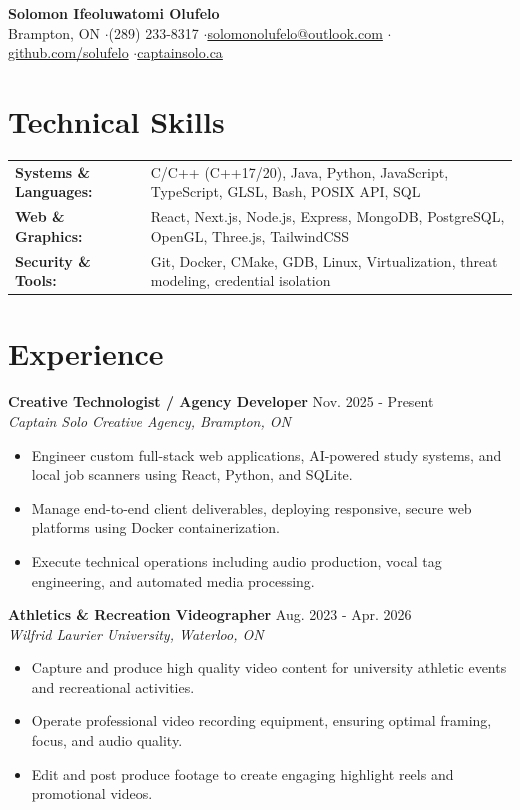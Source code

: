 \documentclass[a4paper,10pt]{article}
\begin{document}
\begin{center}
    {\LARGE \textbf{Solomon Ifeoluwatomi Olufelo}} \\[2pt]
    Brampton, ON \enspace$\cdot$\enspace (289) 233-8317 \enspace$\cdot$\enspace \href{mailto:solomonolufelo@outlook.com}{solomonolufelo@outlook.com} \enspace$\cdot$\enspace \href{https://github.com/solufelo}{github.com/solufelo} \enspace$\cdot$\enspace \href{https://captainsolo.ca}{captainsolo.ca}
\end{center}

\section*{Technical Skills}
\begin{tabularx}{\textwidth}{@{}lX@{}}
\textbf{Systems \& Languages:} & C/C++ (C++17/20), Java, Python, JavaScript, TypeScript, GLSL, Bash, POSIX API, SQL \\
\textbf{Web \& Graphics:} & React, Next.js, Node.js, Express, MongoDB, PostgreSQL, OpenGL, Three.js, TailwindCSS \\
\textbf{Security \& Tools:} & Git, Docker, CMake, GDB, Linux, Virtualization, threat modeling, credential isolation \\
\end{tabularx}

\section*{Experience}
\textbf{Creative Technologist / Agency Developer} \hfill Nov. 2025 - Present \\
\textit{Captain Solo Creative Agency, Brampton, ON}
\begin{itemize}
    \item Engineer custom full-stack web applications, AI-powered study systems, and local job scanners using React, Python, and SQLite.
    \item Manage end-to-end client deliverables, deploying responsive, secure web platforms using Docker containerization.
    \item Execute technical operations including audio production, vocal tag engineering, and automated media processing.
\end{itemize}

\vspace{3pt}
\textbf{Athletics \& Recreation Videographer} \hfill Aug. 2023 - Apr. 2026 \\
\textit{Wilfrid Laurier University, Waterloo, ON}
\begin{itemize}
    \item Capture and produce high quality video content for university athletic events and recreational activities.
    \item Operate professional video recording equipment, ensuring optimal framing, focus, and audio quality.
    \item Edit and post produce footage to create engaging highlight reels and promotional videos.
\end{itemize}
\end{document}

